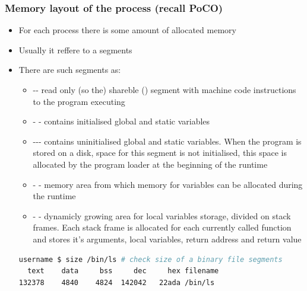 \documentclass[usenames,dvipsnames,10pt,aspectratio=169]{beamer}
\begin{document}
\begin{frame}[fragile]
    \frametitle{Memory layout of the process (recall PoCO)}
    \begin{itemize}
        \item For each process there is some amount of allocated memory
        \item Usually it reffere to a segments
        \item There are such segments as:
        \begin{itemize}
            \item -- read only (so the) shareble () segment with machine code instructions to the program executing 
            \item - - contains initialised global and static variables
            \item --- contains uninitialised global and static variables. When the program is stored on a disk, space for this segment is not initialised, this space is allocated by the program loader at the beginning of the runtime
            \item - - memory area from which memory for variables can be allocated during the runtime
            \item - - dynamicly growing area for local variables storage, divided on stack frames. Each stack frame is allocated for each currently called function and stores it's arguments, local variables, return address and return value
        \end{itemize}
        \begin{lstlisting}[language=Bash, style=shellstyle] 
username $ size /bin/ls # check size of a binary file segments
  text    data     bss     dec     hex filename
132378    4840    4824  142042   22ada /bin/ls
\end{lstlisting}
    \end{itemize}
\end{frame}


\end{document}

